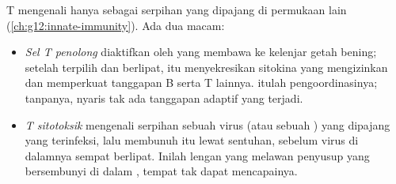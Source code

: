 \begin{proposition}[Limfosit T]\label{prop:g12:adaptive-immunity:tcells}
 T mengenali  hanya sebagai serpihan yang dipajang di
permukaan  lain (\cref{ch:g12:innate-immunity}). Ada dua macam:
\begin{itemize}
  \item \emph{Sel T penolong} diaktifkan oleh  yang membawa  ke kelenjar getah bening;
        setelah terpilih dan berlipat,  itu menyekresikan sitokina
        yang mengizinkan dan memperkuat tanggapan  B serta  T
        lainnya.  itulah pengoordinasinya; tanpanya, nyaris tak ada
        tanggapan adaptif yang terjadi.
  \item \emph{ T sitotoksik} mengenali serpihan sebuah virus (atau
         sebuah ) yang dipajang  yang terinfeksi, lalu
        membunuh  itu lewat sentuhan, sebelum virus di dalamnya
        sempat berlipat. Inilah lengan yang melawan penyusup yang
        bersembunyi di dalam , tempat  tak dapat mencapainya.
\end{itemize}
\end{proposition}
\admitted

